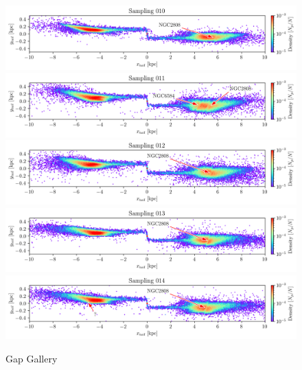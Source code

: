 \documentclass[draft]{aa}
\begin{document}
\begin{appendix}
    \begin{figure}
      \centering
      \includegraphics[width=\linewidth]{gallery_of_gaps_monte-carlo-010.png}
      \includegraphics[width=\linewidth]{gallery_of_gaps_monte-carlo-011.png}
      \includegraphics[width=\linewidth]{gallery_of_gaps_monte-carlo-012.png}
      \includegraphics[width=\linewidth]{gallery_of_gaps_monte-carlo-013.png}
      \includegraphics[width=\linewidth]{gallery_of_gaps_monte-carlo-014.png}
      \caption{Gap Gallery}
      \label{fig:TailCoordinates}
    \end{figure}        



\end{appendix}
\end{document}
